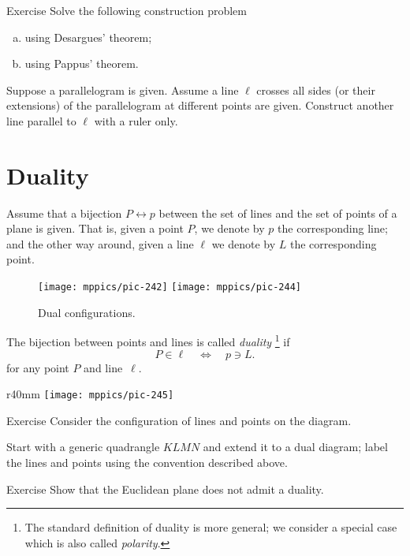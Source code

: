 \begin{thm}{Exercise}\label{ex:desargues-construction}
Solve the following construction problem
\begin{enumerate}[(a)]
\item\label{ex:desargues-construction:desargues} using Desargues' theorem;
\item\label{ex:desargues-construction:pappus} using Pappus' theorem.
\end{enumerate}
Suppose a parallelogram is given.
Assume a line $\ell$ crosses all sides (or their extensions) of the parallelogram at different points are given. 
Construct another line parallel to $\ell$ with a ruler only.
\end{thm}


\section*{Duality}



Assume that a bijection $P\leftrightarrow p$ between the set of lines and the set of points of a plane is given.
That is,
given a point $P$, we denote by $p$ the corresponding line;
and the other way around, 
given a line $\ell$ we denote by $L$ the corresponding point. 

\begin{figure}[h!]
\centering
\texttt{[image: mppics/pic-242]}
\hskip15mm
\texttt{[image: mppics/pic-244]}
\caption*{Dual configurations.}
\end{figure}

The bijection between points and lines is called \emph{duality}\label{page:duality}%
\footnote{The standard definition of duality is more general; we consider a special case which is also called \emph{polarity}.}
if 
\[P\in \ell
\quad
\iff
\quad 
p\ni L.\]
for any point $P$ and line~$\ell$.

{

\begin{wrapfigure}{r}{40mm}
\vskip-4mm
\centering
\texttt{[image: mppics/pic-245]}
\end{wrapfigure}

\begin{thm}{Exercise}\label{ex:dual-configurations}
Consider the configuration of lines and points on the diagram.

Start with a generic quadrangle $KLMN$ and extend it to a dual diagram; label the lines and points using the convention described above.
\end{thm}

\begin{thm}{Exercise}\label{ex:dual-euclid}
Show that the Euclidean plane does not admit a duality. 
\end{thm}

}

